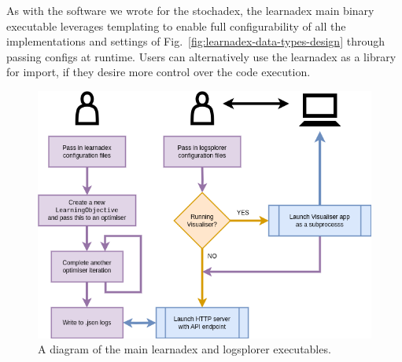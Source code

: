 As with the software we wrote for the stochadex, the learnadex main binary executable leverages templating to enable full configurability of all the implementations and settings of Fig.~\ref{fig:learnadex-data-types-design} through passing configs at runtime. Users can alternatively use the learnadex as a library for import, if they desire more control over the code execution. 

\begin{figure}[h]
\centering
\includegraphics[width=13cm]{images/chapter-4-learnadex-main.drawio.png}
\caption{A diagram of the main learnadex and logsplorer executables.}
\label{fig:learnadex-main}
\end{figure}
    